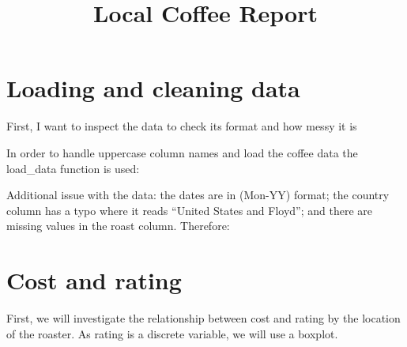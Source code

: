 \documentclass[11pt,preprint]{elsarticle}
\numberwithin{equation}{section}
\numberwithin{figure}{section}
\numberwithin{table}{section}
\begin{document}
\begin{frontmatter}  %

\title{Local Coffee Report}













\vspace{1cm}





\vspace{0.5cm}

\end{frontmatter}

\setcounter{footnote}{0}



\pagestyle{fancy}
\chead{}
\rhead{}
\lfoot{}
\lhead{}
\cfoot{}


\headsep 35pt %




\section{Loading and cleaning data}\label{loading-and-cleaning-data}

First, I want to inspect the data to check its format and how messy it
is

In order to handle uppercase column names and load the coffee data the
load\_data function is used:

Additional issue with the data: the dates are in (Mon-YY) format; the
country column has a typo where it reads ``United States and Floyd'';
and there are missing values in the roast column. Therefore:

\section{Cost and rating}\label{cost-and-rating}

First, we will investigate the relationship between cost and rating by
the location of the roaster. As rating is a discrete variable, we will
use a boxplot.
\end{document}
